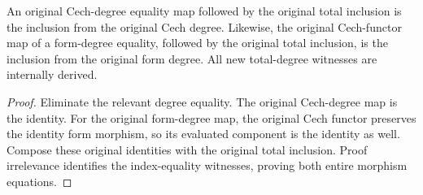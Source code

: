 \begin{theorem}
\label{thm:di-cech-bidegree-map-total-inclusion}
\leanok
{}
An original Cech-degree equality map followed by the original total
inclusion is the inclusion from the original Cech degree. Likewise,
the original Cech-functor map of a form-degree equality, followed by
the original total inclusion, is the inclusion from the original
form degree. All new total-degree witnesses are internally derived.
\end{theorem}
\begin{proof}
\leanok
Eliminate the relevant degree equality. The original Cech-degree
map is the identity. For the original form-degree map, the original
Cech functor preserves the identity form morphism, so its evaluated
component is the identity as well. Compose these original identities
with the original total inclusion. Proof irrelevance identifies the
index-equality witnesses, proving both entire morphism equations.
\end{proof}
